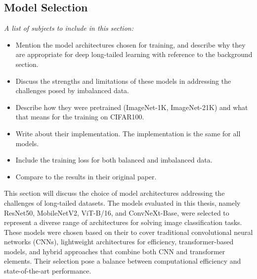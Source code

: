\subsection{Model Selection}
\label{sec:model_selection}
\textit{A list of subjects to include in this section:}

\begin{itemize}
    \item Mention the model architectures chosen for training, and describe why they are appropriate for deep long-tailed learning with reference to the background section.
    \item Discuss the strengths and limitations of these models in addressing the challenges posed by imbalanced data.
    \item Describe how they were pretrained (ImageNet-1K, ImageNet-21K) and what that means for the training on CIFAR100.
    \item Write about their implementation. The implementation is the same for all models. 
    \item Include the training loss for both balanced and imbalanced data.
    \item Compare to the results in their original paper. 
\end{itemize}

This section will discuss the choice of model architectures addressing the challenges of long-tailed datasets. The models evaluated in this thesis, namely ResNet50, MobileNetV2, ViT-B/16, and ConvNeXt-Base, were selected to represent a diverse range of architectures for solving image classification tasks. These models were chosen based on their to cover traditional convolutional neural networks (CNNs), lightweight architectures for efficiency, transformer-based models, and hybrid approaches that combine both CNN and transformer elements. Their selection pose a balance between computational efficiency and state-of-the-art performance.



